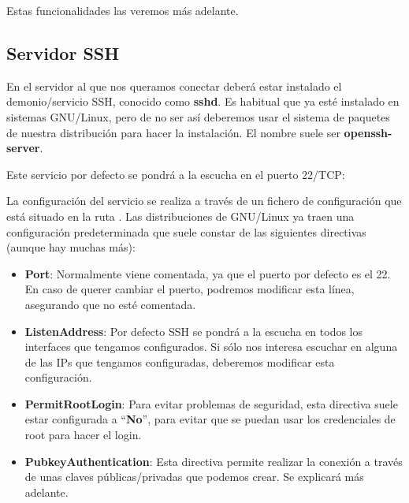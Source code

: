Estas funcionalidades las veremos más adelante.


\subsection{Servidor SSH}
En el servidor al que nos queramos conectar deberá estar instalado el demonio/servicio SSH, conocido como \textbf{sshd}. Es habitual que ya esté instalado en sistemas GNU/Linux, pero de no ser así deberemos usar el sistema de paquetes de nuestra distribución para hacer la instalación. El nombre suele ser \textbf{openssh-server}.

Este servicio por defecto se pondrá a la escucha en el puerto 22/TCP:


La configuración del servicio se realiza a través de un fichero de configuración que está situado en la ruta . Las distribuciones de GNU/Linux ya traen una configuración predeterminada que suele constar de las siguientes directivas (aunque hay muchas más):

\begin{itemize}
    \item \textbf{Port}: Normalmente viene comentada, ya que el puerto por defecto es el 22. En caso de querer cambiar el puerto, podremos modificar esta línea, asegurando que no esté comentada.

    \item \textbf{ListenAddress}: Por defecto SSH se pondrá a la escucha en todos los interfaces que tengamos configurados. Si sólo nos interesa escuchar en alguna de las IPs que tengamos configuradas, deberemos modificar esta configuración.

    \item \textbf{PermitRootLogin}: Para evitar problemas de seguridad, esta directiva suele estar configurada a “\textbf{No}”, para evitar que se puedan usar los credenciales de root para hacer el login.

    \item \textbf{PubkeyAuthentication}: Esta directiva permite realizar la conexión a través de unas claves públicas/privadas que podemos crear. Se explicará más adelante.
\end{itemize}

